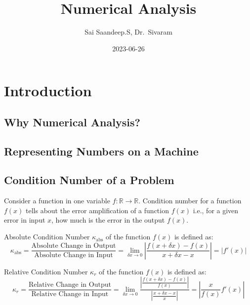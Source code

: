 \documentclass[
]{book}
\title{Numerical Analysis}
\author{Sai Saandeep.S, Dr.~Sivaram}
\date{2023-06-26}
\begin{document}
\maketitle

{
\setcounter{tocdepth}{1}
\tableofcontents
}
\hypertarget{introduction}{%
\chapter{Introduction}\label{introduction}}

\hypertarget{why-numerical-analysis}{%
\section{Why Numerical Analysis?}\label{why-numerical-analysis}}

\hypertarget{representing-numbers-on-a-machine}{%
\section{Representing Numbers on a Machine}\label{representing-numbers-on-a-machine}}

\hypertarget{condition-number-of-a-problem}{%
\section{Condition Number of a Problem}\label{condition-number-of-a-problem}}

Consider a function in one variable \(f:\mathbb{R}\to\mathbb{R}\).
Condition number for a function \(f(x)\) tells about the error amplification of a function \(f(x)\) i.e., for a given error in input \(x\), how much is the error in the output \(f(x)\).

Absolute Condition Number \(\kappa_{\text{abs}}\) of the function \(f(x)\) is defined as:
\begin{equation}
\kappa_{\text{abs}} = \frac{\text{Absolute Change in Output}}{\text{Absolute Change in Input}} = \lim_{\delta x \to 0} \left\lvert{\frac{f(x+\delta x)-f(x)}{x+\delta x - x}}\right\rvert = \left\lvert{f'(x)}\right\rvert
\end{equation}

Relative Condition Number \(\kappa_{r}\) of the function \(f(x)\) is defined as:
\begin{equation}
\kappa_{r} = \frac{\text{Relative Change in Output}}{\text{Relative Change in Input}} = \lim_{\delta x \to 0} \frac{\left\lvert{\frac{f(x+\delta x)-f(x)}{f(x)}}\right\rvert}{\left\lvert{\frac{x+\delta x - x}{x}}\right\rvert} = \left\lvert{\frac{x}{f(x)}f'(x)}\right\rvert
\end{equation}
\end{document}

